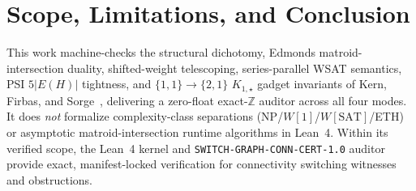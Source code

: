 \documentclass[11pt,twocolumn]{article}
\newcommand{\ZZ}{\mathbb{Z}}
\begin{document}
\section{Scope, Limitations, and Conclusion}\label{sec:conclusion}
This work machine-checks the structural dichotomy, Edmonds matroid-intersection duality, shifted-weight telescoping, series-parallel WSAT semantics, PSI $5|E(H)|$ tightness, and $\{1,1\}\to\{2,1\}$ $K_{1,\star}$ gadget invariants of Kern, Firbas, and Sorge~\cite{kern2026switching}, delivering a zero-float exact-$\ZZ$ auditor across all four modes. It does \emph{not} formalize complexity-class separations ($\mathrm{NP}$/$W[1]$/$W[\mathrm{SAT}]$/ETH) or asymptotic matroid-intersection runtime algorithms in Lean~4. Within its verified scope, the Lean~4 kernel and \texttt{SWITCH-GRAPH-CONN-CERT-1.0} auditor provide exact, manifest-locked verification for connectivity switching witnesses and obstructions.



\end{document}
